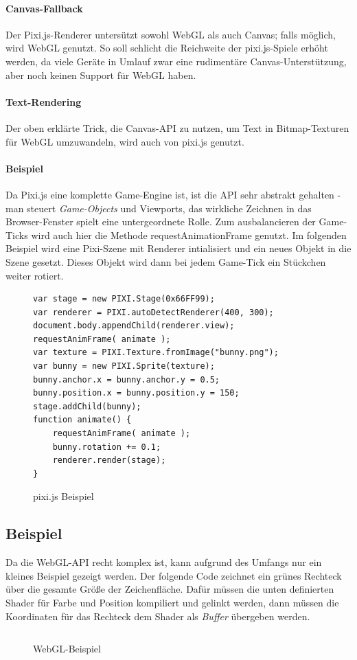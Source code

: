 \documentclass[a4paper, 12pt]{article}
\begin{document}
\paragraph{Canvas-Fallback} Der Pixi.js-Renderer untersützt sowohl WebGL als auch Canvas; falls möglich, wird WebGL genutzt. So soll schlicht die Reichweite der pixi.js-Spiele erhöht werden, da viele Geräte in Umlauf zwar eine rudimentäre Canvas-Unterstützung, aber noch keinen Support für WebGL haben.
\paragraph{Text-Rendering} Der oben erklärte Trick, die Canvas-API zu nutzen, um Text in Bitmap-Texturen für WebGL umzuwandeln, wird auch von pixi.js genutzt.
\paragraph{Beispiel}
Da Pixi.js eine komplette Game-Engine ist, ist die API sehr abstrakt gehalten - man steuert \emph{Game-Objects} und Viewports, das wirkliche Zeichnen in das Browser-Fenster spielt eine untergeordnete Rolle. Zum ausbalancieren der Game-Ticks wird auch hier die Methode requestAnimationFrame genutzt.  Im folgenden Beispiel wird eine Pixi-Szene mit Renderer intialisiert und ein neues Objekt in die Szene gesetzt. Dieses Objekt wird dann bei jedem Game-Tick ein Stückchen weiter rotiert.
\begin{figure}[H]
	\begin{verbatim}
var stage = new PIXI.Stage(0x66FF99);
var renderer = PIXI.autoDetectRenderer(400, 300);
document.body.appendChild(renderer.view);
requestAnimFrame( animate );
var texture = PIXI.Texture.fromImage("bunny.png");
var bunny = new PIXI.Sprite(texture);
bunny.anchor.x = bunny.anchor.y = 0.5;
bunny.position.x = bunny.position.y = 150;
stage.addChild(bunny);
function animate() {
    requestAnimFrame( animate );
    bunny.rotation += 0.1;
    renderer.render(stage);
}
    \end{verbatim}
    \caption{pixi.js Beispiel}
    \label{pixijs_example}
\end{figure}
\newpage
\subsection{Beispiel}
Da die WebGL-API recht komplex ist, kann aufgrund des Umfangs nur ein kleines Beispiel gezeigt werden. Der folgende Code zeichnet ein grünes Rechteck über die gesamte Größe der Zeichenfläche. Dafür müssen die unten definierten Shader für Farbe und Position kompiliert und gelinkt werden, dann müssen die Koordinaten für das Rechteck dem Shader als \emph{Buffer} übergeben werden.
\begin{figure}[H]
	\inputminted{javascript}{assets/vanillawebgl_example.js}
	\caption{WebGL-Beispiel}
	\label{webgl_example}
\end{figure}
\newpage
\end{document}
